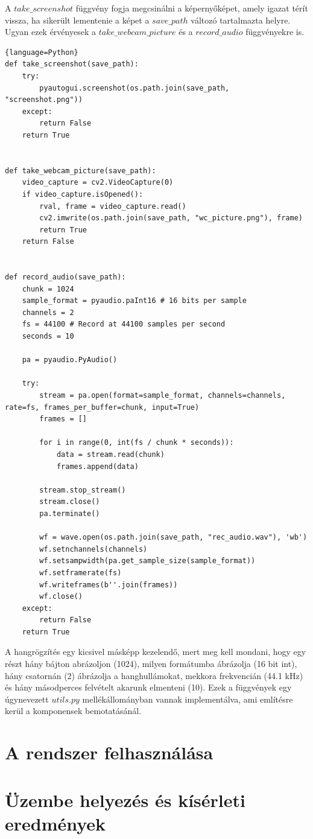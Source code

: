 \documentclass[12pt,a4paper,oneside]{report}
\begin{document}
A $take\_screenshot$ függvény fogja megcsinálni a képernyőképet, amely igazat térít vissza, ha sikerült lementenie a képet a $save\_path$ változó tartalmazta helyre. Ugyan ezek érvényesek a $take\_webcam\_picture$ és a $record\_audio$ függvényekre is.
\begin{lstlisting}{language=Python}
def take_screenshot(save_path):
	try:
		pyautogui.screenshot(os.path.join(save_path, "screenshot.png"))
	except:
		return False
	return True

	
def take_webcam_picture(save_path):
	video_capture = cv2.VideoCapture(0)
	if video_capture.isOpened():
		rval, frame = video_capture.read()
		cv2.imwrite(os.path.join(save_path, "wc_picture.png"), frame)
		return True
	return False


def record_audio(save_path):
	chunk = 1024
	sample_format = pyaudio.paInt16 # 16 bits per sample
	channels = 2
	fs = 44100 # Record at 44100 samples per second
	seconds = 10

	pa = pyaudio.PyAudio()

	try:
		stream = pa.open(format=sample_format, channels=channels, rate=fs, frames_per_buffer=chunk, input=True)
		frames = []

		for i in range(0, int(fs / chunk * seconds)):
			data = stream.read(chunk)
			frames.append(data)

		stream.stop_stream()
		stream.close()
		pa.terminate()

		wf = wave.open(os.path.join(save_path, "rec_audio.wav"), 'wb')
		wf.setnchannels(channels)
		wf.setsampwidth(pa.get_sample_size(sample_format))
		wf.setframerate(fs)
		wf.writeframes(b''.join(frames))
		wf.close()
	except:
		return False
	return True
\end{lstlisting}
A hangrögzítés egy kicsivel másképp kezelendő, mert meg kell mondani, hogy egy részt hány bájton abrázoljon (1024), milyen formátumba ábrázolja (16 bit int), hány csatornán (2) ábrázolja a hanghullámokat, mekkora frekvencián (44.1 kHz) és hány másodperces felvételt akarunk elmenteni (10). Ezek a függvények egy úgynevezett $utils.py$ mellékállományban vannak implementálva, ami említésre kerül a komponensek bemotatásánál.

\chapter{A rendszer felhasználása}\label{sec:useage}

\chapter{Üzembe helyezés és kísérleti eredmények}\label{sec:testcases}
\end{document}
